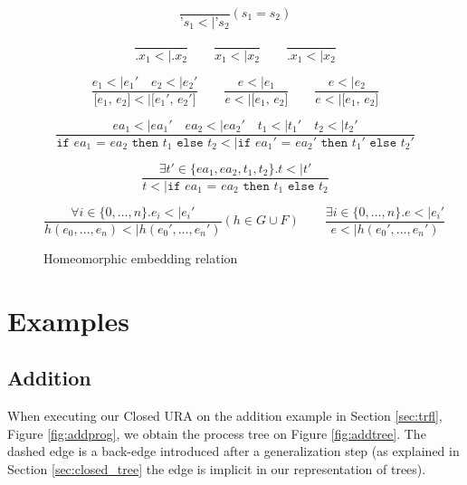 \documentclass[10pt]{../sigplanconf}
\newcommand{\nfrac}[2]{\frac{\displaystyle{#1}}{\displaystyle{#2}}}
\newcommand{\tagsc}[1]{\tag{\scshape #1}}
\begin{document}
\begin{figure*}\centering
  \begin{equation}
    \nfrac{
    }{
      \texttt{'}s_1 <| \texttt{'}s_2
    } (s_1 = s_2) \tagsc{Atoms}
  \end{equation}

  \begin{equation}
    \nfrac{
    }{
      \texttt{.}x_1 <| \texttt{.}x_2
    }
    \qquad
    \nfrac{
    }{
      x_1 <| x_2
    }
    \qquad
    \nfrac{
    }{
      \texttt{.}x_1 <| x_2
    } \tagsc{Variables}
  \end{equation}

  \begin{equation}
    \nfrac{
      e_1 <| e_1'\quad e_2 <| e_2'
    }{
      \texttt{[$e_1$, $e_2$]} <| \texttt{[$e_1'$, $e_2'$]}
    }
    \qquad
    \nfrac{
      e <| e_1
    }{
      e <| \texttt{[$e_1$, $e_2$]}
    }
    \qquad
    \nfrac{
      e <| e_2
    }{
      e <| \texttt{[$e_1$, $e_2$]}
    }
    \tagsc{Cons}
  \end{equation}

  \begin{equation}
    \nfrac{
      ea_1 <| ea_1' \quad ea_2 <| ea_2' \quad t_1 <| t_1' \quad t_2 <| t_2'
    }{
      \texttt{if $ea_1$ = $ea_2$ then $t_1$ else $t_2$} <| \texttt{if $ea_1'$ = $ea_2'$ then $t_1'$ else $t_2'$}
    } \tagsc{If-A}
  \end{equation}

  \begin{equation}
    \nfrac{
      \exists t' \in \{ea_1, ea_2, t_1, t_2\}. t <| t'
    }{
      t <| \texttt{if $ea_1$ = $ea_2$ then $t_1$ else $t_2$}
    } \tagsc{If-B}
  \end{equation}

\begin{equation}
  \nfrac{
    \forall i \in \{0, \ldots, n\}. e_i <| e_i'
  }{
    h(e_0, \ldots, e_n) <| h(e_0', \ldots, e_n')
  } (h \in G \cup F)
  \qquad
  \nfrac{
    \exists i \in \{0, \ldots, n\}. e <| e_i'
  }{
    e <| h(e_0', \ldots, e_n')
  }
 \tagsc{Call}
\end{equation}

\caption{Homeomorphic embedding relation}
\label{fig:embedding}
\end{figure*}

\section{Examples}
\subsection{Addition}
When executing our Closed URA on the addition example in Section
\ref{sec:trfl}, Figure \ref{fig:addprog}, we obtain the process tree
on Figure \ref{fig:addtree}. The dashed edge is a back-edge introduced
after a generalization step (as explained in Section
\ref{sec:closed_tree} the edge is implicit in our representation
of trees).
\end{document}
